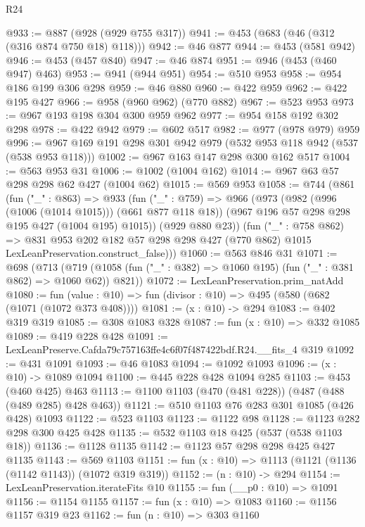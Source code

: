 \begin{lexlean}{R24}
\begin{coremodule}
@933 := @887 (@928 (@929 @755 @317))
@941 := @453 (@683 (@46 (@312 (@316 @874 @750 @18) @118)))
@942 := @46 @877
@944 := @453 (@581 @942)
@946 := @453 (@457 @840)
@947 := @46 @874
@951 := @946 (@453 (@460 @947) @463)
@953 := @941 (@944 @951)
@954 := @510 @953
@958 := @954 @186 @199 @306 @298
@959 := @46 @880
@960 := @422 @959
@962 := @422 @195 @427
@966 := @958 (@960 @962) (@770 @882)
@967 := @523 @953
@973 := @967 @193 @198 @304 @300 @959 @962
@977 := @954 @158 @192 @302 @298
@978 := @422 @942
@979 := @602 @517
@982 := @977 (@978 @979) @959
@996 := @967 @169 @191 @298 @301 @942 @979 (@532 @953 @118 @942 (@537 (@538 @953 @118)))
@1002 := @967 @163 @147 @298 @300 @162 @517
@1004 := @563 @953 @31
@1006 := @1002 (@1004 @162)
@1014 := @967 @63 @57 @298 @298 @62 @427 (@1004 @62)
@1015 := @569 @953
@1058 := @744
    (@861
      (fun ("_" : @863) =>
      @933
        (fun ("_" : @759) =>
        @966
          (@973
            (@982 (@996 (@1006 (@1014 @1015))) (@661 @877 @118 @18))
            (@967 @196 @57 @298 @298 @195 @427 (@1004 @195) @1015))
          (@929 @880 @23))
        (fun ("_" : @758 @862) =>
        @831
          @953
          @202
          @182
          @57
          @298
          @298
          @427
          (@770 @862)
          @1015
          LexLeanPreservation.construct_false)))
@1060 := @563 @846 @31
@1071 := @698
    (@713 (@719 (@1058 (fun ("_" : @382) => @1060 @195) (fun ("_" : @381 @862) => @1060 @62)) @821))
@1072 := LexLeanPreservation.prim_natAdd
@1080 := fun (value : @10) => fun (divisor : @10) => @495 (@580 (@682 (@1071 (@1072 @373 @408))))
@1081 := (x : @10) -> @294
@1083 := @402 @319 @319
@1085 := @308 @1083 @328
@1087 := fun (x : @10) => @332 @1085
@1089 := @419 @228 @428
@1091 := LexLeanPreserve.Cafda79c757163ffe4c6f07f487422bdf.R24.__fits_4 @319
@1092 := @431 @1091
@1093 := @46 @1083
@1094 := @1092 @1093
@1096 := (x : @10) -> @1089 @1094
@1100 := @445 @228 @428 @1094 @285
@1103 := @453 (@460 @425) @463
@1113 := @1100 @1103 (@470 (@481 @228)) (@487 (@488 (@489 @285) @428 @463))
@1121 := @510 @1103 @76 @283 @301 @1085 (@426 @428) @1093
@1122 := @523 @1103
@1123 := @1122 @98
@1128 := @1123 @282 @298 @300 @425 @428
@1135 := @532 @1103 @18 @425 (@537 (@538 @1103 @18))
@1136 := @1128 @1135
@1142 := @1123 @57 @298 @298 @425 @427 @1135
@1143 := @569 @1103
@1151 := fun (x : @10) => @1113 (@1121 (@1136 (@1142 @1143)) (@1072 @319 @319))
@1152 := (n : @10) -> @294
@1154 := LexLeanPreservation.iterateFits @10
@1155 := fun (__p0 : @10) => @1091
@1156 := @1154 @1155
@1157 := fun (x : @10) => @1083
@1160 := @1156 @1157 @319 @23
@1162 := fun (n : @10) => @303 @1160

\end{coremodule}
\end{lexlean}
